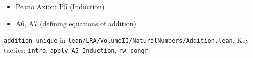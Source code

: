 \begin{remark*}[Dependencies]
\begin{itemize}
  \item \hyperref[ax:landau-peano]{Peano Axiom P5 (Induction)}
  \item \hyperref[thm:landau-addition-exists-unique]{A6, A7 (defining equations of addition)}
\end{itemize}

\end{remark*}

\begin{remark*}
\texttt{addition\_unique} in
\texttt{lean/LRA/VolumeII/NaturalNumbers/Addition.lean}.
Key tactics: \texttt{intro}, \texttt{apply A5\_Induction},
\texttt{rw}, \texttt{congr}.
\end{remark*}